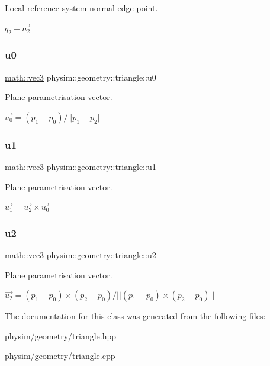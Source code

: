 Local reference system normal edge point. 

$q_2 + \vec{n_2}$ \mbox{\label{classphysim_1_1geometry_1_1triangle_a330380022489f6a4c40bc3a0ec74b021}} 
\subsubsection{\texorpdfstring{u0}{u0}}
{\footnotesize\ttfamily \hyperlink{structphysim_1_1math_1_1vec3}{math\+::vec3} physim\+::geometry\+::triangle\+::u0\hspace{0.3cm}{\ttfamily [private]}}



Plane parametrisation vector. 

$ \vec{u_0} = (p_1 - p_0)/||p_1 - p_2|| $ \mbox{\label{classphysim_1_1geometry_1_1triangle_a4af756a7338103b26dd60e1663fe1279}} 
\subsubsection{\texorpdfstring{u1}{u1}}
{\footnotesize\ttfamily \hyperlink{structphysim_1_1math_1_1vec3}{math\+::vec3} physim\+::geometry\+::triangle\+::u1\hspace{0.3cm}{\ttfamily [private]}}



Plane parametrisation vector. 

$ \vec{u_1} = \vec{u_2} \times \vec{u_0} $ \mbox{\label{classphysim_1_1geometry_1_1triangle_a179ce681e75d39b776b54ec104f956a1}} 
\subsubsection{\texorpdfstring{u2}{u2}}
{\footnotesize\ttfamily \hyperlink{structphysim_1_1math_1_1vec3}{math\+::vec3} physim\+::geometry\+::triangle\+::u2\hspace{0.3cm}{\ttfamily [private]}}



Plane parametrisation vector. 

$ \vec{u_2} = (p_1-p_0)\times(p_2-p_0)/ || (p_1-p_0)\times(p_2-p_0) || $ 

The documentation for this class was generated from the following files\+:\begin{DoxyCompactItemize}
\item 
physim/geometry/triangle.\+hpp\item 
physim/geometry/triangle.\+cpp\end{DoxyCompactItemize}
